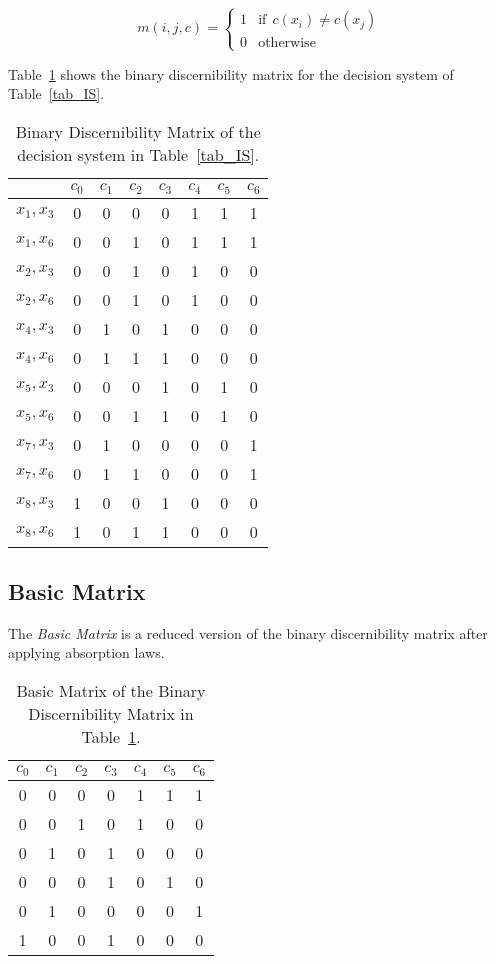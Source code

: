 \documentclass[authoryear,preprint,review,12pt]{elsarticle}
\begin{document}
  \begin{equation}
  	m(i, j, c)=\left\lbrace\begin{array}{cl}
  			1 & \mathrm{if~~}c(x_i) \neq c(x_j) \\
  			0 								   & \mathrm{otherwise} 
  	\end{array}\right.
  \end{equation} 
  
  Table~\ref{tab_BDM} shows the binary discernibility matrix for the decision system of Table~\ref{tab_IS}.  
  
  \begin{table}[htb]
		\caption{Binary Discernibility Matrix of the decision system in Table~\ref{tab_IS}.} \label{tab_BDM}
		\centering
 	\begin{tabular}{c|ccccccc}
 		& $c_0$ & $c_1$ & $c_2$ & $c_3$ & $c_4$ & $c_5$ & $c_6$\\
 		\hline
		$x_1,x_3$ & 0&0&0&0&1&1&1\\
		$x_1,x_6$ & 0&0&1&0&1&1&1\\
		$x_2,x_3$ & 0&0&1&0&1&0&0\\
		$x_2,x_6$ & 0&0&1&0&1&0&0\\
		$x_4,x_3$ & 0&1&0&1&0&0&0\\
		$x_4,x_6$ & 0&1&1&1&0&0&0\\
		$x_5,x_3$ & 0&0&0&1&0&1&0\\
		$x_5,x_6$ & 0&0&1&1&0&1&0\\
		$x_7,x_3$ & 0&1&0&0&0&0&1\\
		$x_7,x_6$ & 0&1&1&0&0&0&1\\
		$x_8,x_3$ & 1&0&0&1&0&0&0\\
		$x_8,x_6$ & 1&0&1&1&0&0&0\\
 	\end{tabular}             
  \end{table}

\subsection{Basic Matrix}\label{sect_SBDM}
  The \textit{Basic Matrix} is a reduced version of the binary discernibility matrix after applying absorption laws. 
    
  \begin{table}[htb]
	\caption{Basic Matrix of the Binary Discernibility Matrix in Table~\ref{tab_BDM}.}
	\centering
   	\begin{tabular}{ccccccc}\label{tab:SBDM1}
              $c_0$ & $c_1$ & $c_2$ & $c_3$ & $c_4$ & $c_5$ & $c_6$\\
          		\hline
          		0&0&0&0&1&1&1\\
          		0&0&1&0&1&0&0\\
          		0&1&0&1&0&0&0\\
          		0&0&0&1&0&1&0\\
          		0&1&0&0&0&0&1\\
          		1&0&0&1&0&0&0\\
   	\end{tabular}             
  \end{table}  
   
\end{document}

